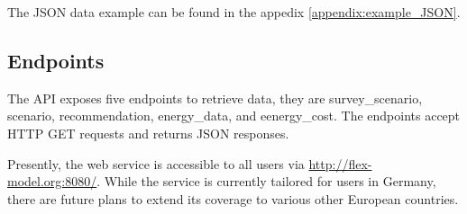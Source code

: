 The JSON data example can be found in the appedix \ref{appendix:example_JSON}. 

\subsection{Endpoints}

The API exposes five endpoints to retrieve data,
they are survey\_scenario, scenario, recommendation, energy\_data, and eenergy\_cost.
The endpoints accept HTTP GET requests and returns JSON responses. 


Presently, the web service is accessible to all users via \url{http://flex-model.org:8080/}. 
While the service is currently tailored for users in Germany, there are future plans to extend its coverage to various other European countries. 